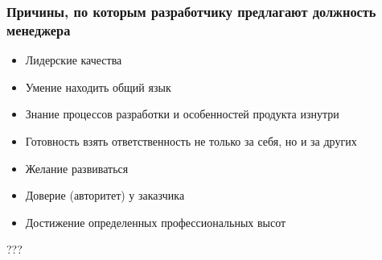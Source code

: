 \documentclass{../industrial-development}
\begin{document}
\begin{frame} \frametitle{Причины, по которым разработчику предлагают должность менеджера}
\begin{itemize}
		\item Лидерские качества
		\item Умение находить общий язык
		\item Знание процессов разработки и особенностей продукта изнутри
		\item Готовность взять ответственность не только за себя, но и за других
		\item Желание развиваться
		\item Доверие (авторитет) у заказчика
		\item Достижение определенных профессиональных высот

	\end{itemize}
\end{frame}
\lecturenotes
???
~\cite{How_to_be_a_good_IT-manager}
\end{document}
